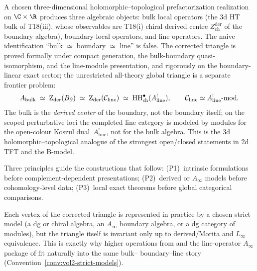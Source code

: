 A chosen three-dimensional holomorphic--topological prefactorization
realization on
$\C \times \R$ produces three algebraic objects: bulk local
operators (the 3d HT bulk of T18(iii), whose observables are
T18(i) chiral derived centre $Z^{\mathrm{der}}_{\mathrm{ch}}$ of the
boundary algebra), boundary local operators, and line operators. The
naive identification ``bulk $\simeq$ boundary $\simeq$ line'' is
false. The corrected triangle is proved formally under compact
generation, the bulk-boundary quasi-isomorphism, and the line-module
presentation, and rigorously on the boundary-linear exact sector; the
unrestricted all-theory global triangle is a separate frontier problem:
\begin{equation}%
\Abulk
\;\simeq\;
\Zder(\Bbound)
\;\simeq\;
\Zder(\cC_{\mathrm{line}})
\;\simeq\;
\HH^\bullet_{\mathrm{ch}}(A^!_{\mathrm{line}}),
\qquad
\cC_{\mathrm{line}}\simeq A^!_{\mathrm{line}}\text{-mod}.
\end{equation}
The bulk is the \emph{derived center} of the boundary, not the
boundary itself; on the scoped perturbative loci the completed line
category is modeled by modules for the open-colour Koszul
dual~$A^!_{\mathrm{line}}$, not for the bulk algebra. This is the 3d
holomorphic--topological analogue of the strongest open/closed
statements in 2d TFT and the B-model.

Three principles guide the constructions that follow: (P1)~intrinsic
formulations before complement-dependent presentations;
(P2)~derived or $A_\infty$ models before cohomology-level data;
(P3)~local exact theorems before global categorical comparisons.

\begin{remark}
Each vertex of the corrected triangle is represented in practice by a
chosen strict model (a dg or chiral algebra, an $A_\infty$ boundary
algebra, or a dg category of modules), but the triangle itself is
invariant only up to derived/Morita and $L_\infty$ equivalence. This
is exactly why higher operations from \cite{GKW25} and the line-operator
$A_\infty$ package of \cite{DNP25} fit naturally into the same bulk--
boundary--line story
(Convention~\ref{conv:vol2-strict-models}).
\end{remark}

